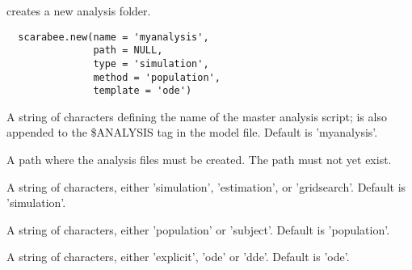 %
\begin{Description}\relax
{} creates a new  analysis folder.
\end{Description}
%
\begin{Usage}
\begin{verbatim}
  scarabee.new(name = 'myanalysis',
               path = NULL,
               type = 'simulation',
               method = 'population',
               template = 'ode')
\end{verbatim}
\end{Usage}
%
\begin{Arguments}
\begin{ldescription}
\item[\code{name}] A string of characters defining the name of the master analysis
script;  is also appended to the \$ANALYSIS tag in the model file.
Default is 'myanalysis'.
\item[\code{path}] A path where the analysis files must be created. The path must 
not yet exist.
\item[\code{type}] A string of characters, either 'simulation', 'estimation', or 
'gridsearch'. Default is 'simulation'.
\item[\code{method}] A string of characters, either 'population' or 'subject'.
Default is 'population'.
\item[\code{template}] A string of characters, either 'explicit', 'ode' or 'dde'.
Default is 'ode'.
\end{ldescription}
\end{Arguments}
%
